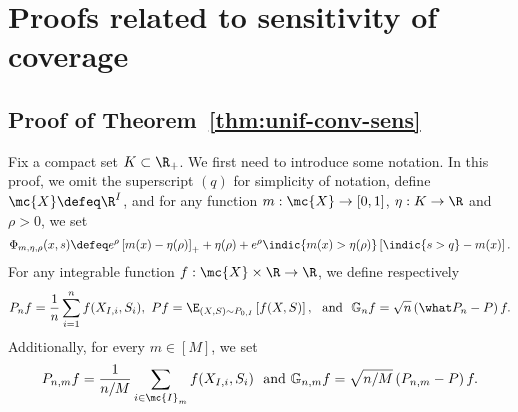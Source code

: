 \section{Proofs related to sensitivity of coverage}
\label{sensitivity-proofs}

\subsection{Proof of Theorem~\ref{thm:unif-conv-sens}}
\label{sec:proof-of-unif-conv-sens}

Fix a compact set $K \subset \R_+$.
We first need to introduce some notation. 
In this proof, we omit the superscript $(q)$ for simplicity of notation,  define $\mc{X} \defeq \R^I$, and for any function $m : \mc{X} \to [0,1]$, $\eta : K \to \R$ and $\rho>0$, we set
\begin{align*}
\Phi_{m, \eta, \rho} (x,  s) \defeq e^\rho \left[ m(x) - \eta(\rho) \right]_+ + \eta(\rho) + e^\rho \indic{ m(x) > \eta(\rho)} \left[ \indic{s > q} - m(x) \right].
\end{align*}
For any integrable function $f : \mc{X} \times \R \to \R$,  we define respectively
\begin{align*}
P_n f = \frac{1}{n} \sum_{i=1}^n f(X_{I,i}, S_i), ~ P f = \E_{(X,S) \sim P_{0,I}} \left[ f(X,S) \right],  ~ \text{ and } ~ \mathbb{G}_n f = \sqrt{n} \left( \what P_n - P \right) f.
\end{align*}
Additionally, for every $m \in [M]$, we set
\begin{align*}
P_{n,m} f = \frac{1}{n/M} \sum_{i \in \mc{I}_m} f(X_{I,i}, S_i) ~ \text{ and } \mathbb{G}_{n,m}f = \sqrt{n/M} \left(P_{n,m} - P \right) f.
\end{align*}

